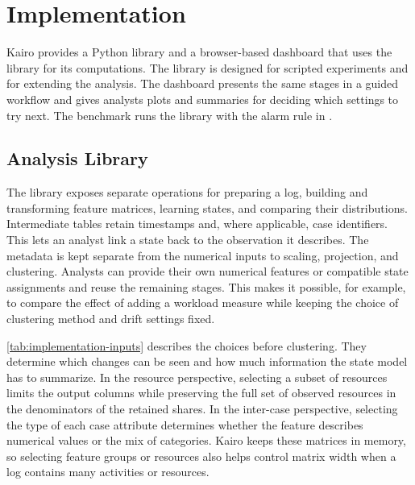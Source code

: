 \section{Implementation}\label{sec:implementation}

Kairo provides a Python library and a browser-based dashboard that uses the library for its computations. The library is designed for scripted experiments and for extending the analysis. The dashboard presents the same stages in a guided workflow and gives analysts plots and summaries for deciding which settings to try next. The benchmark runs the library with the alarm rule in .

\subsection{Analysis Library}
\label{sec:implementation-library}

The library exposes separate operations for preparing a log, building and transforming feature matrices, learning states, and comparing their distributions. Intermediate tables retain timestamps and, where applicable, case identifiers. This lets an analyst link a state back to the observation it describes. The metadata is kept separate from the numerical inputs to scaling, projection, and clustering. Analysts can provide their own numerical features or compatible state assignments and reuse the remaining stages. This makes it possible, for example, to compare the effect of adding a workload measure while keeping the choice of clustering method and drift settings fixed.

\autoref{tab:implementation-inputs} describes the choices before clustering. They determine which changes can be seen and how much information the state model has to summarize. In the resource perspective, selecting a subset of resources limits the output columns while preserving the full set of observed resources in the denominators of the retained shares. In the inter-case perspective, selecting the type of each case attribute determines whether the feature describes numerical values or the mix of categories. Kairo keeps these matrices in memory, so selecting feature groups or resources also helps control matrix width when a log contains many activities or resources.

